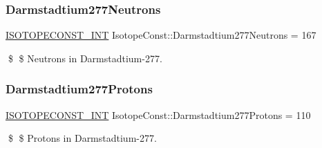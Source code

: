 \subsubsection{\texorpdfstring{Darmstadtium277\+Neutrons}{Darmstadtium277Neutrons}}
{\footnotesize\ttfamily \mbox{\hyperlink{group___isotope_const-_macros_ga5f18360b3e99483a35c32d789e62621c}{I\+S\+O\+T\+O\+P\+E\+C\+O\+N\+S\+T\+\_\+\+I\+NT}} Isotope\+Const\+::\+Darmstadtium277\+Neutrons = 167}

\$ \$ Neutrons in Darmstadtium-\/277. \mbox{\label{group___isotope_const-_darmstadtium-_ds277_gaa4207785e0aaae220757284d5a977734}} 
\subsubsection{\texorpdfstring{Darmstadtium277\+Protons}{Darmstadtium277Protons}}
{\footnotesize\ttfamily \mbox{\hyperlink{group___isotope_const-_macros_ga5f18360b3e99483a35c32d789e62621c}{I\+S\+O\+T\+O\+P\+E\+C\+O\+N\+S\+T\+\_\+\+I\+NT}} Isotope\+Const\+::\+Darmstadtium277\+Protons = 110}

\$ \$ Protons in Darmstadtium-\/277. 
